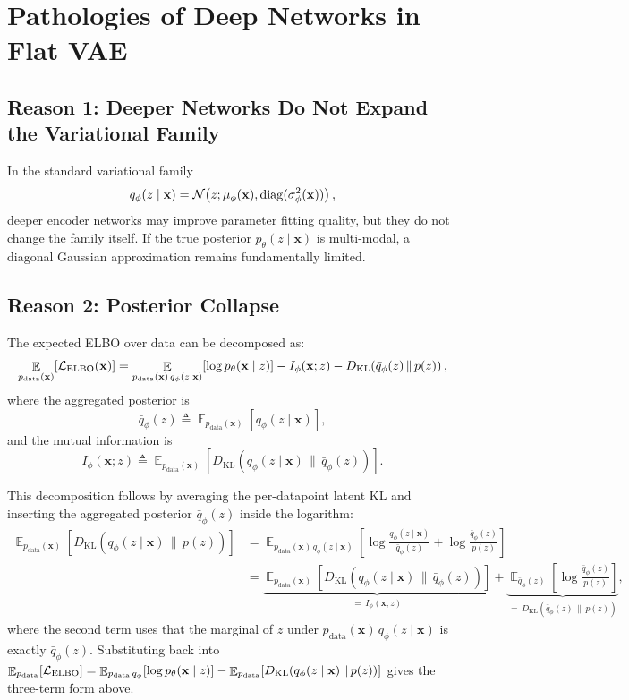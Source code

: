 \documentclass[11pt,a4paper]{article}
\DeclareMathOperator*{\E}{\mathbb{E}}
\DeclareMathOperator{\diag}{diag}
\newcommand{\bx}{\mathbf{x}} \newcommand{\by}{\mathbf{y}}
\newcommand{\KL}[2]{D_{\mathrm{KL}}\!\left(#1\,\|\,#2\right)}
\newcommand{\elbo}{\cL_{\mathrm{ELBO}}}
\newcommand{\pdata}{p_{\mathrm{data}}}
\begin{document}
\section{Pathologies of Deep Networks in Flat VAE}\label{sec:pathologies}

\subsection{Reason 1: Deeper Networks Do Not Expand the Variational Family}

In the standard variational family
\[
    q_\phi(z\mid \bx)=\cN\!\left(z;\mu_\phi(\bx),\diag(\sigma_\phi^2(\bx))\right),
\]
deeper encoder networks may improve parameter fitting quality, but they do not change the family itself. If the true posterior $p_\theta(z\mid \bx)$ is multi-modal, a diagonal Gaussian approximation remains fundamentally limited.

\subsection{Reason 2: Posterior Collapse}

The expected ELBO over data can be decomposed as:
\[
    \E_{\pdata(\bx)}[\elbo(\bx)]
    =
    \E_{\pdata(\bx)\,q_\phi(z\mid \bx)}[\log p_\theta(\bx\mid z)]
    - I_\phi(\bx;z)
    - \KL{\bar q_\phi(z)}{p(z)},
\]
where the aggregated posterior is
\[
    \bar q_\phi(z) \triangleq \E_{\pdata(\bx)}[q_\phi(z\mid \bx)],
\]
and the mutual information is
\[
    I_\phi(\bx;z)
    \triangleq
    \E_{\pdata(\bx)}
    \!\left[\KL{q_\phi(z\mid \bx)}{\bar q_\phi(z)}\right].
\]

This decomposition follows by averaging the per-datapoint latent KL and inserting the aggregated posterior $\bar q_\phi(z)$ inside the logarithm:
\begin{align*}
    \E_{\pdata(\bx)}\!\left[\KL{q_\phi(z\mid \bx)}{p(z)}\right]
    &= \E_{\pdata(\bx)\,q_\phi(z\mid \bx)}\!\left[\log\frac{q_\phi(z\mid \bx)}{\bar q_\phi(z)} + \log\frac{\bar q_\phi(z)}{p(z)}\right]\\
    &= \underbrace{\E_{\pdata(\bx)}\!\left[\KL{q_\phi(z\mid \bx)}{\bar q_\phi(z)}\right]}_{=\,I_\phi(\bx;z)}
     + \underbrace{\E_{\bar q_\phi(z)}\!\left[\log\frac{\bar q_\phi(z)}{p(z)}\right]}_{=\,\KL{\bar q_\phi(z)}{p(z)}},
\end{align*}
where the second term uses that the marginal of $z$ under $\pdata(\bx)\,q_\phi(z\mid \bx)$ is exactly $\bar q_\phi(z)$. Substituting back into $\E_{\pdata}[\elbo]=\E_{\pdata\,q_\phi}[\log p_\theta(\bx\mid z)]-\E_{\pdata}[\KL{q_\phi(z\mid \bx)}{p(z)}]$ gives the three-term form above.
\end{document}
